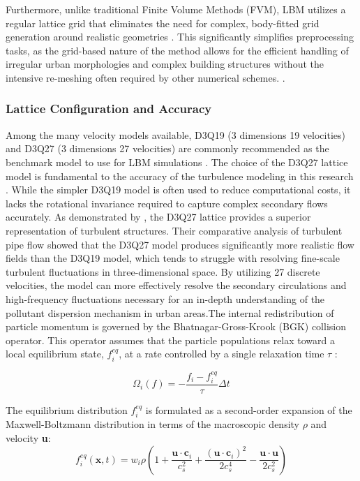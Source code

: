 Furthermore, unlike traditional Finite Volume Methods (FVM), LBM utilizes a regular lattice grid that eliminates the need for complex, body-fitted grid generation around realistic geometries \parencite{Hu2025}. This significantly simplifies preprocessing tasks, as the grid-based nature of the method allows for the efficient handling of irregular urban morphologies and complex building structures without the intensive re-meshing often required by other numerical schemes. \parencite{Hu2025}.

\subsubsection{Lattice Configuration and Accuracy}
Among the many velocity models available, D3Q19 (3 dimensions 19 velocities) and D3Q27 (3 dimensions 27 velocities) are commonly recommended as the benchmark model to use for LBM simulations \parencite{Hu2025}. The choice of the D3Q27 lattice model is fundamental to the accuracy of the turbulence modeling in this research \parencite{Yokouchi2020Simulation}. While the simpler D3Q19 model is often used to reduce computational costs, it lacks the rotational invariance required to capture complex secondary flows accurately. As demonstrated by \textcite{Suga2015D3Q27}, the D3Q27 lattice provides a superior representation of turbulent structures. Their comparative analysis of turbulent pipe flow showed that the D3Q27 model produces significantly more realistic flow fields than the D3Q19 model, which tends to struggle with resolving fine-scale turbulent fluctuations in three-dimensional space. By utilizing 27 discrete velocities, the model can more effectively resolve the secondary circulations and high-frequency fluctuations necessary for an in-depth understanding of the pollutant dispersion mechanism in urban areas.The internal redistribution of particle momentum is governed by the Bhatnagar-Gross-Krook (BGK) collision operator. This operator assumes that the particle populations relax toward a local equilibrium state, $f_i^{eq}$, at a rate controlled by a single relaxation time $\tau$ \parencite{Kruger2017LBM}:

\begin{equation}
    \Omega_i(f) = -\frac{f_i - f_i^{eq}}{\tau}\Delta t    
\end{equation}

The equilibrium distribution $f_i^{eq}$ is formulated as a second-order expansion of the Maxwell-Boltzmann distribution in terms of the macroscopic density $\rho$ and velocity \textbf{u}:
\begin{equation}
    f_i^{eq}(\mathbf{x},t) = w_i \rho \left( 1 + \frac{\mathbf{u} \cdot \mathbf{c}_i}{c_s^2} + \frac{(\mathbf{u} \cdot \mathbf{c}_i)^2}{2c_s^4} - \frac{\mathbf{u} \cdot \mathbf{u}}{2c_s^2} \right)    
\end{equation}

